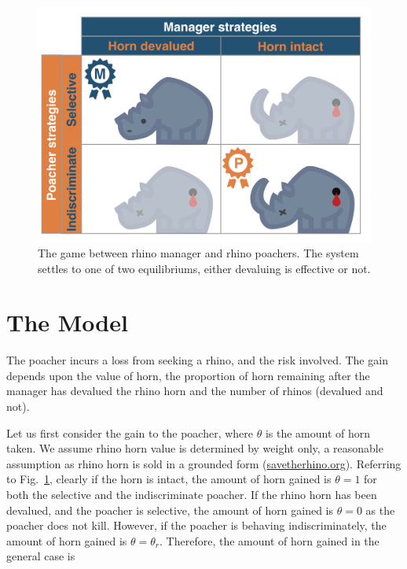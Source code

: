 \documentclass[10pt]{article}
\begin{document}
\begin{figure}
\centering
\includegraphics[scale=0.2]{images/RhinoPic.pdf}
\caption{\label{fig:RhinoPic} The game between rhino manager and rhino poachers.
The system settles to one of two equilibriums, either devaluing is effective or not.}
\end{figure}

\section{The Model}\label{section:the_model}

The poacher incurs a loss from seeking a rhino, and the risk involved. The gain 
depends upon the value of horn, the proportion of horn remaining after the 
manager has devalued the rhino horn and the number of rhinos (devalued and
not).

Let us first consider the gain to the poacher, where \(\theta\) is the amount of 
horn taken. We assume rhino horn value is determined by weight only, a 
reasonable assumption as rhino horn is sold in a grounded form (\url{savetherhino.org}).
Referring to Fig.~\ref{fig:RhinoPic}, clearly if the horn is intact, the amount of
horn gained is \(\theta=1\) for both the selective and the indiscriminate poacher.
If the rhino horn has been devalued, and the poacher is selective, the amount of horn 
gained is \(\theta=0\) as the poacher does not kill. However, if the poacher is 
behaving indiscriminately, the amount of horn gained is \(\theta = \theta_r\). 
Therefore, the amount of horn gained in the general case is
\end{document}
